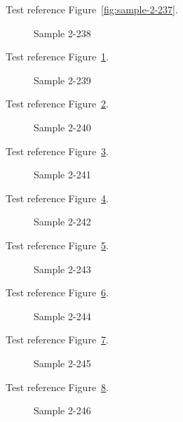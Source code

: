 Test reference Figure~\ref{fig:sample-2-237}.

\begin{figure}[tbhp]
\caption{Sample 2-238}
\label{fig:sample-2-238}
\end{figure}

Test reference Figure~\ref{fig:sample-2-238}.

\begin{figure}[tbhp]
\caption{Sample 2-239}
\label{fig:sample-2-239}
\end{figure}

Test reference Figure~\ref{fig:sample-2-239}.

\begin{figure}[tbhp]
\caption{Sample 2-240}
\label{fig:sample-2-240}
\end{figure}

Test reference Figure~\ref{fig:sample-2-240}.

\begin{figure}[tbhp]
\caption{Sample 2-241}
\label{fig:sample-2-241}
\end{figure}

Test reference Figure~\ref{fig:sample-2-241}.

\begin{figure}[tbhp]
\caption{Sample 2-242}
\label{fig:sample-2-242}
\end{figure}

Test reference Figure~\ref{fig:sample-2-242}.

\begin{figure}[tbhp]
\caption{Sample 2-243}
\label{fig:sample-2-243}
\end{figure}

Test reference Figure~\ref{fig:sample-2-243}.

\begin{figure}[tbhp]
\caption{Sample 2-244}
\label{fig:sample-2-244}
\end{figure}

Test reference Figure~\ref{fig:sample-2-244}.

\begin{figure}[tbhp]
\caption{Sample 2-245}
\label{fig:sample-2-245}
\end{figure}

Test reference Figure~\ref{fig:sample-2-245}.

\begin{figure}[tbhp]
\caption{Sample 2-246}
\label{fig:sample-2-246}
\end{figure}

